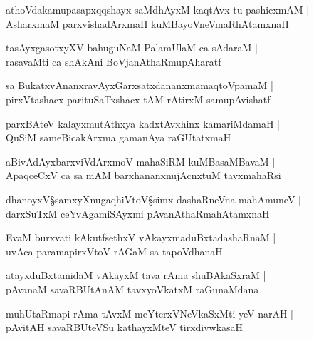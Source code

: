 \begin{shloka}
athoVdakamupasapxqqshayx saMdhAyxM kaqtAvx tu pashicxmAM |\\
AsharxmaM parxvishadArxmaH kuMBayoVneVmaRhAtamxnaH 
\end{shloka}

\begin{shloka}
tasAyxgasotxyXV bahuguNaM PalamUlaM ca sAdaraM |\\
rasavaMti ca shAkAni BoVjanAthaRmupAharatf 
\end{shloka}

\begin{shloka}
sa BukatxvAnanxravAyxGarxsatxdananxmamaqtoVpamaM |\\
pirxVtashacx parituSaTxshacx tAM rAtirxM samupAvishatf 
\end{shloka}

\begin{shloka}
parxBAteV kalayxmutAthxya kadxtAvxhinx kamariMdamaH |\\
QuSiM sameBicakArxma gamanAya raGUtatxmaH 
\end{shloka}

\begin{shloka}
aBivAdAyxbarxviVdArxmoV mahaSiRM kuMBasaMBavaM |\\
ApaqceCxV ca sa mAM barxhananxnujAcnxtuM tavxmahaRsi
\end{shloka}

\begin{shloka}
dhanoyxV\S samxyXnugaqhiVtoV\S simx dashaRneVna mahAmuneV |\\
darxSuTxM ceYvAgamiSAyxmi pAvanAthaRmahAtamxnaH 
\end{shloka}

\begin{shloka}
EvaM burxvati kAkutfsethxV vAkayxmaduBxtadashaRnaM |\\
uvAca paramapirxVtoV rAGaM sa tapoVdhanaH 
\end{shloka}

\begin{shloka}
atayxduBxtamidaM vAkayxM tava rAma shuBAkaSxraM |\\
pAvanaM savaRBUtAnAM tavxyoVkatxM raGunaMdana
\end{shloka}

\begin{shloka}
muhUtaRmapi rAma tAvxM meYterxVNeVkaSxMti yeV narAH |\\
pAvitAH savaRBUteVSu kathayxMteV tirxdivwkasaH 
\end{shloka}

